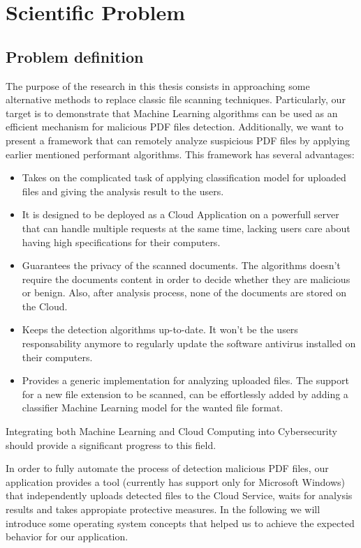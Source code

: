 \chapter{Scientific Problem}
\label{section:scientificProblem}

\section{Problem definition}
\label{section:problemDefinition}
The purpose of the research in this thesis consists in approaching some alternative methods to replace classic file scanning techniques. Particularly, our target is to demonstrate that Machine Learning algorithms can be used as an efficient mechanism for malicious PDF files detection. Additionally, we want to present a framework that can remotely analyze suspicious PDF files by applying earlier mentioned performant algorithms. This framework has several advantages: 
\begin{itemize}
    \item Takes on the complicated task of applying classification model for uploaded files and giving the analysis result to the users.
    \item It is designed to be deployed as a Cloud Application on a powerfull server that can handle multiple requests at the same time, lacking users care about having high specifications for their computers.
    \item Guarantees the privacy of the scanned documents. The algorithms doesn't require the documents content in order to decide whether they are malicious or benign. Also, after analysis process, none of the documents are stored on the Cloud.
    \item Keeps the detection algorithms up-to-date. It won't be the users responsability anymore to regularly update the software antivirus installed on their computers. 
    \item Provides a generic implementation for analyzing uploaded files. The support for a new file extension to be scanned, can be effortlessly added by adding a classifier Machine Learning model for the wanted file format.
\end{itemize}
Integrating both Machine Learning and Cloud Computing into Cybersecurity should provide a significant progress to this field. \par


In order to fully automate the process of detection malicious PDF files, our application provides a tool (currently has support only for Microsoft Windows) that independently uploads detected files to the Cloud Service, waits for analysis results and takes appropiate protective measures. In the following we will introduce some operating system concepts that helped us to achieve the expected behavior for our application.

